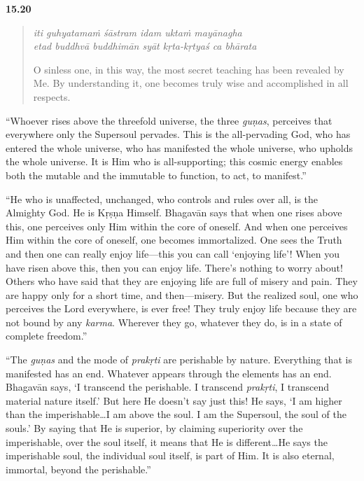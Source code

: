\par\noindent\textbf{15.20}\par
\begin{verse}
\textit{iti guhyatamaṁ śāstram idam uktaṁ mayānagha} \\
\textit{etad buddhvā buddhimān syāt kṛta-kṛtyaś ca bhārata}

\noindent O sinless one, in this way, the most secret teaching has been revealed by Me. By understanding it, one becomes truly wise and accomplished in all respects.
\end{verse}
\par


\enquote{Whoever rises above the threefold universe, the three \textit{guṇas}, perceives that everywhere only the Supersoul pervades. This is the all-pervading God, who has entered the whole universe, who has manifested the whole universe, who upholds the whole universe. It is Him who is all-supporting; this cosmic energy enables both the mutable and the immutable to function, to act, to manifest.}

\enquote{He who is unaffected, unchanged, who controls and rules over all, is the Almighty God. He is Kṛṣṇa Himself. Bhagavān says that when one rises above this, one perceives only Him within the core of oneself. And when one perceives Him within the core of oneself, one becomes immortalized. One sees the Truth and then one can really enjoy life---this you can call \enquote{enjoying life}! When you have risen above this, then you can enjoy life. There’s nothing to worry about! Others who have said that they are enjoying life are full of misery and pain. They are happy only for a short time, and then---misery. But the realized soul, one who perceives the Lord everywhere, is ever free! They truly enjoy life because they are not bound by any \textit{karma}. Wherever they go, whatever they do, is in a state of complete freedom.}

\enquote{The \textit{guṇas} and the mode of \textit{prakṛti} are perishable by nature. Everything that is manifested has an end. Whatever appears through the elements has an end. Bhagavān says, \enquote{I transcend the perishable. I transcend \textit{prakṛti}, I transcend material nature itself.} But here He doesn’t say just this! He says, \enquote{I am higher than the imperishable\ldots I am above the soul. I am the Supersoul, the soul of the souls.} By saying that He is superior, by claiming superiority over the imperishable, over the soul itself, it means that He is different\ldots He says the imperishable soul, the individual soul itself, is part of Him. It is also eternal, immortal, beyond the perishable.}

